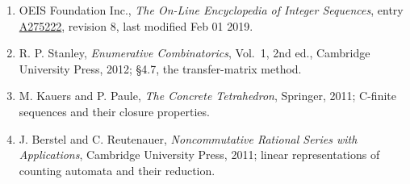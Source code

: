 \documentclass[11pt]{article}
\theoremstyle{definition}
\begin{document}
\begin{enumerate}

\item OEIS Foundation Inc., \emph{The On-Line Encyclopedia of Integer Sequences}, entry \href{https://oeis.org/A275222}{A275222}, revision 8, last modified Feb 01 2019.

\item R. P. Stanley, \emph{Enumerative Combinatorics}, Vol.~1, 2nd ed., Cambridge University Press, 2012; \S4.7, the transfer-matrix method.

\item M. Kauers and P. Paule, \emph{The Concrete Tetrahedron}, Springer, 2011; C-finite sequences and their closure properties.

\item J. Berstel and C. Reutenauer, \emph{Noncommutative Rational Series with Applications}, Cambridge University Press, 2011; linear representations of counting automata and their reduction.

\end{enumerate}
\end{document}
